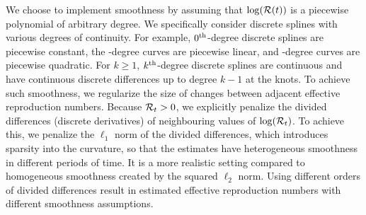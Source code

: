 We choose to implement smoothness by assuming that $\log(\mathcal{R}(t))$ is a
piecewise polynomial of arbitrary degree. We specifically consider discrete
splines with various degrees of continuity. For example, $0^{\textnormal{th}}$-degree discrete
splines are piecewise constant, the \first-degree curves are piecewise linear,
and \second-degree curves are piecewise quadratic. For $k\geq 1$, $k^{\textnormal{th}}$-degree
discrete splines are continuous and have continuous discrete differences up to
degree $k-1$ at the knots. To achieve such smoothness, we regularize the size of
changes between adjacent effective reproduction numbers. Because $\mathcal{R}_t > 0$,
we explicitly penalize the divided differences (discrete derivatives) of
neighbouring values of $\log(\mathcal{R}_t)$. To achieve this, we penalize the
$\ell_1$ norm of the divided differences, which introduces sparsity into the
curvature, so that the estimates have heterogeneous smoothness in different
periods of time. It is a more realistic setting compared to
homogeneous smoothness created by the squared $\ell_2$ norm. Using different
orders of divided differences result in estimated effective reproduction numbers
with different smoothness assumptions. 


